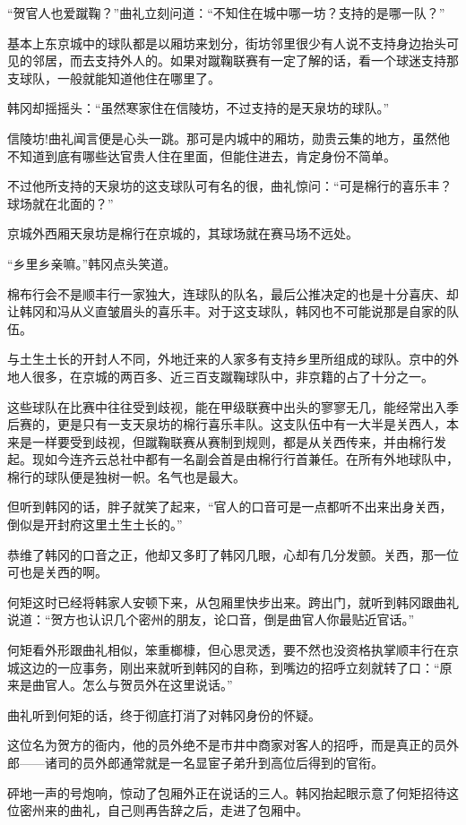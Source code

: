 “贺官人也爱蹴鞠？”曲礼立刻问道：“不知住在城中哪一坊？支持的是哪一队？”

基本上东京城中的球队都是以厢坊来划分，街坊邻里很少有人说不支持身边抬头可见的邻居，而去支持外人的。如果对蹴鞠联赛有一定了解的话，看一个球迷支持那支球队，一般就能知道他住在哪里了。

韩冈却摇摇头：“虽然寒家住在信陵坊，不过支持的是天泉坊的球队。”

信陵坊!曲礼闻言便是心头一跳。那可是内城中的厢坊，勋贵云集的地方，虽然他不知道到底有哪些达官贵人住在里面，但能住进去，肯定身份不简单。

不过他所支持的天泉坊的这支球队可有名的很，曲礼惊问：“可是棉行的喜乐丰？球场就在北面的？”

京城外西厢天泉坊是棉行在京城的，其球场就在赛马场不远处。

“乡里乡亲嘛。”韩冈点头笑道。

棉布行会不是顺丰行一家独大，连球队的队名，最后公推决定的也是十分喜庆、却让韩冈和冯从义直皱眉头的喜乐丰。对于这支球队，韩冈也不可能说那是自家的队伍。

与土生土长的开封人不同，外地迁来的人家多有支持乡里所组成的球队。京中的外地人很多，在京城的两百多、近三百支蹴鞠球队中，非京籍的占了十分之一。

这些球队在比赛中往往受到歧视，能在甲级联赛中出头的寥寥无几，能经常出入季后赛的，更是只有一支天泉坊的棉行喜乐丰队。这支队伍中有一大半是关西人，本来是一样要受到歧视，但蹴鞠联赛从赛制到规则，都是从关西传来，并由棉行发起。现如今连齐云总社中都有一名副会首是由棉行行首兼任。在所有外地球队中，棉行的球队便是独树一帜。名气也是最大。

但听到韩冈的话，胖子就笑了起来，“官人的口音可是一点都听不出来出身关西，倒似是开封府这里土生土长的。”

恭维了韩冈的口音之正，他却又多盯了韩冈几眼，心却有几分发颤。关西，那一位可也是关西的啊。

何矩这时已经将韩家人安顿下来，从包厢里快步出来。跨出门，就听到韩冈跟曲礼说道：“贺方也认识几个密州的朋友，论口音，倒是曲官人你最贴近官话。”

何矩看外形跟曲礼相似，笨重榔槺，但心思灵透，要不然也没资格执掌顺丰行在京城这边的一应事务，刚出来就听到韩冈的自称，到嘴边的招呼立刻就转了口：“原来是曲官人。怎么与贺员外在这里说话。”

曲礼听到何矩的话，终于彻底打消了对韩冈身份的怀疑。

这位名为贺方的衙内，他的员外绝不是市井中商家对客人的招呼，而是真正的员外郎——诸司的员外郎通常就是一名显宦子弟升到高位后得到的官衔。

砰地一声的号炮响，惊动了包厢外正在说话的三人。韩冈抬起眼示意了何矩招待这位密州来的曲礼，自己则再告辞之后，走进了包厢中。